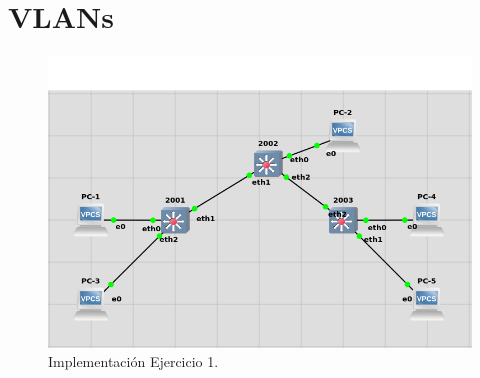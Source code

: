\documentclass[letterpaper,12pt]{article}
\begin{document}
\section{VLANs}
\begin{figure}[ht] 
        
        \centering \includegraphics[width=0.8\columnwidth]{lab01.PNG}
        \caption{
                \label{fig:samplesetup} %
                Implementación Ejercicio 1.
        }
\end{figure}
\end{document}
